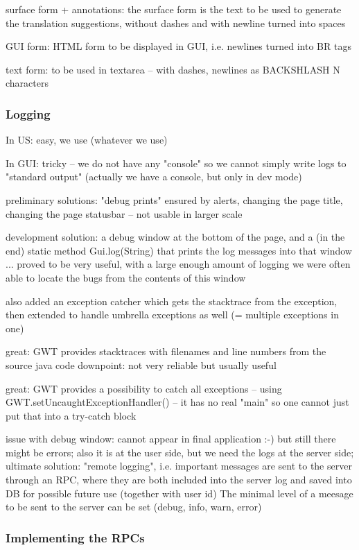 surface form + annotations: the surface form is the text to be used to generate the translation suggestions, without dashes and with newline turned into spaces

GUI form: HTML form to be displayed in GUI, i.e. newlines turned into BR tags

text form: to be used in textarea -- with dashes, newlines as BACKSHLASH N characters

\subsubsection{Logging}

In US: easy, we use (whatever we use)


In GUI: tricky -- we do not have any "console" so we cannot simply write logs to "standard output"
(actually we have a console, but only in dev mode)

preliminary solutions: "debug prints" ensured by alerts, changing the page title, changing the page statusbar -- not usable in larger scale

development solution: a debug window at the bottom of the page, and a (in the end) static method Gui.log(String) that prints the log messages into that window
... proved to be very useful, with a large enough amount of logging we were often able to locate the bugs from the contents of this window

also added an exception catcher which gets the stacktrace from the exception, then extended to handle umbrella exceptions as well (= multiple exceptions in one)

great: GWT provides stacktraces with filenames and line numbers from the source java code
downpoint: not very reliable but usually useful

great: GWT provides a possibility to catch all exceptions -- using GWT.setUncaughtExceptionHandler() -- it has no real "main" so one cannot just put that into a try-catch block

issue with debug window: cannot appear in final application :-) but still there might be errors;
also it is at the user side, but we need the logs at the server side;
ultimate solution: "remote logging", i.e. important messages are sent to the server through an RPC, where they are both included into the server log and saved into DB for possible future use (together with user id)
The minimal level of a meesage to be sent to the server can be set (debug, info, warn, error)

\subsubsection{Implementing the RPCs}


